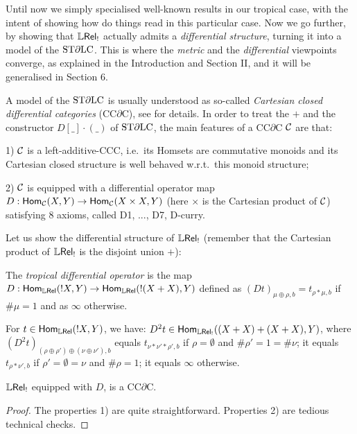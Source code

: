 Until now we simply specialised well-known results in our tropical case, with the intent of showing how do things read in this particular case.
Now we go further, by showing that $\mathbb{L} \mathsf{Rel}_!$ actually admits a \emph{differential structure}, turning it into a model of the $\mathrm{ST}\partial\mathrm{LC}$.
This is where the \emph{metric} and the \emph{differential} viewpoints converge, as explained in the Introduction and Section II, and it will be generalised in Section 6.

A model of the $\mathrm{ST}\partial\mathrm{LC}$ is usually understood as so-called \emph{Cartesian closed differential categories} (CC$\partial$C), see \cite{Manzo2010} for details.
In order to treat the $+$ and the constructor $D[\_]\cdot (\_)$ of $\mathrm{ST}\partial\mathrm{LC}$, the main features of a CC$\partial$C $\mathcal{C}$ are that:

1) $\mathcal{C}$ is a left-additive-CCC, i.e.\ its Homsets are commutative monoids and its Cartesian closed structure is well behaved w.r.t.\ this monoid structure;

2) $\mathcal{C}$ is equipped with a differential operator map $D:\mathsf{Hom}_{\mathcal{C}}(X,Y)\to \mathsf{Hom}_{\mathcal{C}}(X\times X,Y)$ (here $\times$ is the Cartesian product of $\mathcal{C}$) satisfying $8$ axioms, called D1, ..., D7, D-curry.

Let us show the differential structure of $\mathbb{L} \mathsf{Rel}_!$ (remember that the Cartesian product of $\mathbb{L} \mathsf{Rel}_!$ is the disjoint union $+$): 

\begin{definition}
 The \emph{tropical differential operator} is the map $D:\mathsf{Hom}_{\mathbb{L} \mathsf{Rel}}(!X,Y)\to \mathsf{Hom}_{\mathbb{L} \mathsf{Rel}}(!(X+X),Y)$ defined as $(Dt)_{\mu\oplus\rho,b}=t_{\rho*\mu,b}$ if $\#\mu=1$ and as $\infty$ otherwise.
\end{definition}

\begin{remark}
For $t\in\mathsf{Hom}_{\mathbb{L} \mathsf{Rel}}(!X,Y)$, we have:
 $D^2 t\in\mathsf{Hom}_{\mathbb{L} \mathsf{Rel}_!}((X+X)+(X+X),Y)$, where $(D^2 t)_{(\rho\oplus\rho')\oplus(\nu\oplus\nu'),b}$ equals $t_{\nu*\nu'*\rho',b}$ if $\rho=\emptyset$ and $\#\rho'=1=\#\nu$; it equals $t_{\rho*\nu',b}$ if $\rho'=\emptyset=\nu$ and $\#\rho=1$; it equals $\infty$ otherwise.
\end{remark}

\begin{theorem}\label{thm:LREL!CCDC}
 $\mathbb{L} \mathsf{Rel}_!$ equipped with $D$, is a CC$\partial$C.
\end{theorem}
\begin{proof}
 The properties 1) are quite straightforward.
 Properties 2) are tedious technical checks.
\end{proof}


